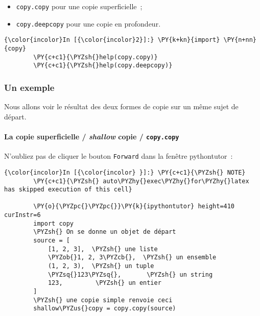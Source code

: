 \begin{itemize}
\tightlist
\item
  \texttt{copy.copy} pour une copie superficielle~;
\item
  \texttt{copy.deepcopy} pour une copie en profondeur.
\end{itemize}

    \begin{Verbatim}[commandchars=\\\{\},frame=single,framerule=0.3mm,rulecolor=\color{cellframecolor}]
{\color{incolor}In [{\color{incolor}2}]:} \PY{k+kn}{import} \PY{n+nn}{copy}
        \PY{c+c1}{\PYZsh{}help(copy.copy)}
        \PY{c+c1}{\PYZsh{}help(copy.deepcopy)}
\end{Verbatim}


    \hypertarget{un-exemple}{%
\subsubsection{Un exemple}\label{un-exemple}}

    Nous allons voir le résultat des deux formes de copie sur un même sujet
de départ.

    \hypertarget{la-copie-superficielle-shallow-copie-copy.copy}{%
\paragraph{\texorpdfstring{La copie superficielle / \emph{shallow} copie
/
\texttt{copy.copy}}{La copie superficielle / shallow copie / copy.copy}}\label{la-copie-superficielle-shallow-copie-copy.copy}}

    N'oubliez pas de cliquer le bouton \texttt{Forward} dans la fenêtre
pythontutor~:

    \begin{Verbatim}[commandchars=\\\{\},frame=single,framerule=0.3mm,rulecolor=\color{cellframecolor}]
{\color{incolor}In [{\color{incolor} }]:} \PY{c+c1}{\PYZsh{} NOTE}
        \PY{c+c1}{\PYZsh{} auto\PYZhy{}exec\PYZhy{}for\PYZhy{}latex has skipped execution of this cell}
        
        \PY{o}{\PYZpc{}\PYZpc{}}\PY{k}{ipythontutor} height=410 curInstr=6
        import copy
        \PYZsh{} On se donne un objet de départ
        source = [
            [1, 2, 3],  \PYZsh{} une liste
            \PYZob{}1, 2, 3\PYZcb{},  \PYZsh{} un ensemble
            (1, 2, 3),  \PYZsh{} un tuple
            \PYZsq{}123\PYZsq{},       \PYZsh{} un string
            123,         \PYZsh{} un entier
        ]
        \PYZsh{} une copie simple renvoie ceci
        shallow\PYZus{}copy = copy.copy(source)
\end{Verbatim}


